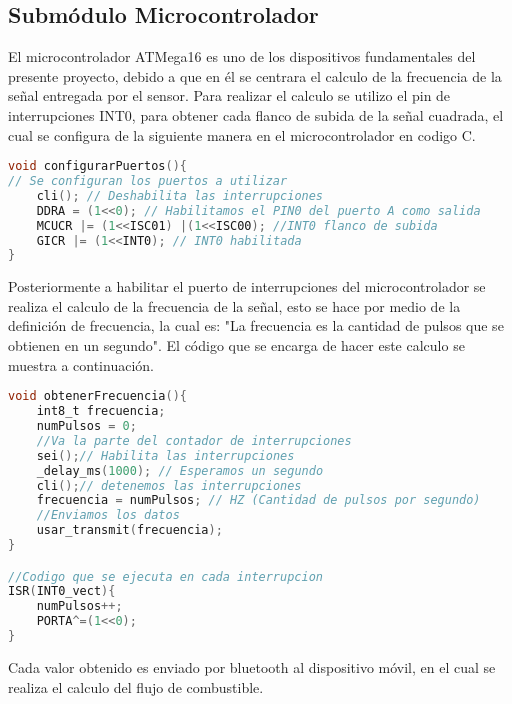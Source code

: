 \subsection{Submódulo Microcontrolador}
El microcontrolador ATMega16 es uno de los dispositivos fundamentales del presente proyecto, debido a que en él se centrara el calculo de la frecuencia de la señal entregada por el sensor.
Para realizar el calculo se utilizo el pin de interrupciones INT0, para obtener cada flanco de subida de la señal cuadrada, el cual se configura de la siguiente manera en el microcontrolador en codigo C.
\begin{lstlisting}[language= C]
void configurarPuertos(){
// Se configuran los puertos a utilizar
	cli(); // Deshabilita las interrupciones
	DDRA = (1<<0); // Habilitamos el PIN0 del puerto A como salida
	MCUCR |= (1<<ISC01) |(1<<ISC00); //INT0 flanco de subida
	GICR |= (1<<INT0); // INT0 habilitada
}
\end{lstlisting}
Posteriormente a habilitar el puerto de interrupciones del microcontrolador se realiza el calculo de la frecuencia de la señal, esto se hace por medio de la definición de frecuencia, la cual es: "La frecuencia es la cantidad de pulsos que se obtienen en un segundo".
\newline
El código que se encarga de hacer este calculo se muestra a continuación.
\begin{lstlisting}[language= C]
void obtenerFrecuencia(){
	int8_t frecuencia;
	numPulsos = 0;
	//Va la parte del contador de interrupciones
	sei();// Habilita las interrupciones
	_delay_ms(1000); // Esperamos un segundo
	cli();// detenemos las interrupciones
	frecuencia = numPulsos; // HZ (Cantidad de pulsos por segundo)
	//Enviamos los datos
	usar_transmit(frecuencia);
}

//Codigo que se ejecuta en cada interrupcion
ISR(INT0_vect){
	numPulsos++;	
	PORTA^=(1<<0);
}
\end{lstlisting}
Cada valor obtenido es enviado por bluetooth al dispositivo móvil, en el cual se realiza el calculo del flujo de combustible.

